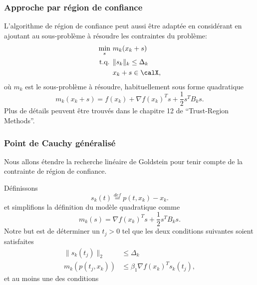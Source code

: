 \documentclass[t,aspectratio=169,usepdftitle=false]{beamer}
\def\cX{\calX}
\begin{document}
\begin{frame}
\begin{center}
\end{center}

\end{frame}

\begin{frame}
\frametitle{Approche par région de confiance}

L'algorithme de région de confiance peut aussi être adaptée en considérant en ajoutant au sous-problème à résoudre les contraintes du problème:
\begin{align*}
\min_s\ & m_k(x_k+s) \\
\mbox{t.q. } & \| s_k \|_k \leq \Delta_k \\
& x_k+s \in \cX,
\end{align*}
où $m_k$ est le sous-problème à résoudre, habituellement sous forme quadratique
$$
m_k(x_k+s) = f(x_k) + \nabla f(x_k)^Ts + \frac{1}{2}s^TB_ks.
$$
Plus de détails peuvent être trouvés dans le chapitre 12 de ``Trust-Region Methods''.

\end{frame}

\begin{frame}
\frametitle{Point de Cauchy généralisé}

Nous allons étendre la recherche linéaire de Goldstein pour tenir compte de la contrainte de région de confiance.

\mbox{}

Définissons
$$
s_k(t) \overset{def}{=} p(t,x_k) - x_k.
$$
et simplifions la définition du modèle quadratique comme
$$
m_k(s) = \nabla f(x_k)^Ts + \frac{1}{2}s^TB_ks.
$$
Notre but est de déterminer un $t_j > 0$ tel que les deux conditions suivantes soient satisfaites
\begin{align*}
\| s_k(t_j) \|_2 & \leq \Delta_k \\
m_k(p(t_j,x_k)) & \leq \beta_1 \nabla f(x_k)^T s_k(t_j),
\end{align*} 
et au moins une des conditions

\end{frame}
\end{document}
